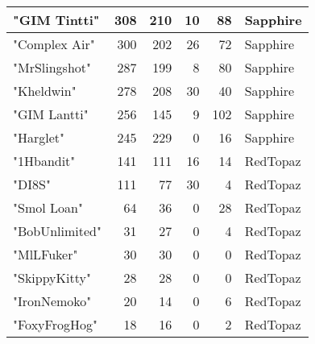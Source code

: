 \documentclass{article}
\begin{document}
\begin{table}[htbp]
\begin{tabular}{|l|r|r|r|r|l|}
"GIM Tintti" & 308 & 210 & 10 & 88 & Sapphire \\ \hline
"Complex Air" & 300 & 202 & 26 & 72 & Sapphire \\ \hline
"MrSlingshot" & 287 & 199 & 8 & 80 & Sapphire \\ \hline
"Kheldwin" & 278 & 208 & 30 & 40 & Sapphire \\ \hline
"GIM Lantti" & 256 & 145 & 9 & 102 & Sapphire \\ \hline
"Harglet" & 245 & 229 & 0 & 16 & Sapphire \\ \hline
"1Hbandit" & 141 & 111 & 16 & 14 & RedTopaz \\ \hline
"DI8S" & 111 & 77 & 30 & 4 & RedTopaz \\ \hline
"Smol Loan" & 64 & 36 & 0 & 28 & RedTopaz \\ \hline
"BobUnlimited" & 31 & 27 & 0 & 4 & RedTopaz \\ \hline
"MlLFuker" & 30 & 30 & 0 & 0 & RedTopaz \\ \hline
"SkippyKitty" & 28 & 28 & 0 & 0 & RedTopaz \\ \hline
"IronNemoko" & 20 & 14 & 0 & 6 & RedTopaz \\ \hline
"FoxyFrogHog" & 18 & 16 & 0 & 2 & RedTopaz \\ \hline
\end{tabular}
\end{table}
\end{document}
